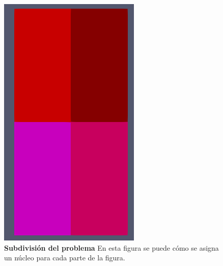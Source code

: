 \documentclass{article}
\begin{document}
\begin{figure} 
    \centering
    \includegraphics[scale=0.5]{../res/imgs/image5.png}
    \caption{\textbf{Subdivisión del problema }En esta figura se puede cómo se asigna un núcleo para cada parte de la figura.}
\end{figure}
\end{document}
